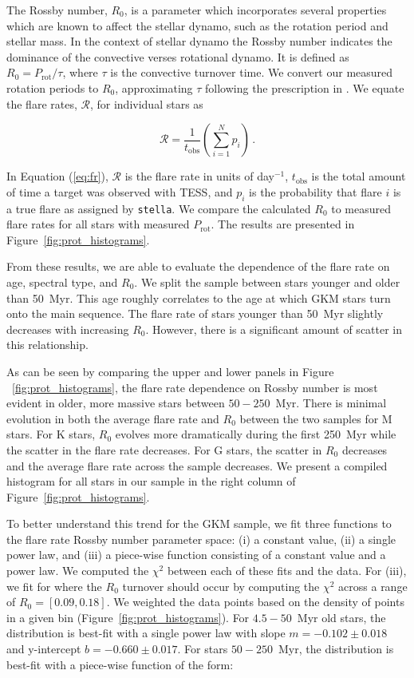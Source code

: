 \documentclass[twocolumn, linenumbers]{aastex631}
\begin{document}
The Rossby number, $R_0$, is a parameter which incorporates  several properties which
are known to affect the stellar dynamo, such as the rotation period and stellar mass.
In the context of stellar dynamo the Rossby number indicates the dominance of the
convective verses rotational dynamo. It is defined as $R_0 = P_\textrm{rot}/\tau$,
where $\tau$ is the convective turnover time. We convert our measured rotation periods
to $R_0$,  approximating $\tau$ following the prescription in \cite{wright11}. We
equate the flare rates, $\mathcal{R}$, for individual stars as

\begin{equation}\label{eq:fr}
  \mathcal{R} = \frac{1}{t_\textrm{obs}} \left( \sum_{i=1}^{N} p_i \right)\,.
\end{equation}

In Equation (\ref{eq:fr}), $\mathcal{R}$ is the flare rate in units of day$^{-1}$,
$t_\textrm{obs}$ is the total amount of time a target was observed with TESS, and
$p_i$ is the probability that flare $i$ is a true flare as assigned by \texttt{stella}.
We compare the calculated $R_0$ to measured flare rates for all stars with measured
$P_\textrm{rot}$. The results are presented in Figure~\ref{fig:prot_histograms}.


From these results, we are able to evaluate the dependence of the flare rate on age,
spectral type,  and $R_0$. We split the sample between stars younger and older than
50~Myr. This age roughly correlates to the age at which GKM stars turn onto the main
sequence. The flare rate of stars younger than 50~Myr slightly decreases with
increasing $R_0$. However, there is a significant amount of scatter in this relationship.

As can be seen by comparing the upper and  lower panels in Figure ~\ref{fig:prot_histograms},
the flare rate dependence on Rossby number is most evident in older, more massive stars
between $50 - 250$~Myr. There is minimal evolution in both the average flare rate
and $R_0$ between the two samples for M stars. For K stars,  $R_0$ evolves more
dramatically during the first 250~Myr while the scatter in the flare rate decreases.
For G stars, the scatter in $R_0$ decreases and the average flare rate across the
sample decreases. We present a compiled histogram for all stars in our sample in the
right column of Figure~\ref{fig:prot_histograms}.

To better understand this trend for the GKM sample, we fit three functions to the
flare rate Rossby number parameter space: (i) a constant value, (ii) a single power
law, and (iii) a piece-wise function consisting of a constant value and a power law.
We computed the $\chi^2$ between each of these fits and the data. For (iii), we fit
for where the $R_0$ turnover should occur by computing the $\chi^2$ across a range
of $R_0 = [0.09, 0.18]$. We weighted the data points based on the density of points
in a given bin (Figure~\ref{fig:prot_histograms}). For  $4.5 - 50$~Myr old stars,
the distribution is best-fit with a single power law with slope $m = -0.102 \pm 0.018$
and y-intercept $b = -0.660 \pm 0.017$. For stars $50 - 250$~Myr, the distribution
is best-fit with a piece-wise function of the form:
\end{document}
